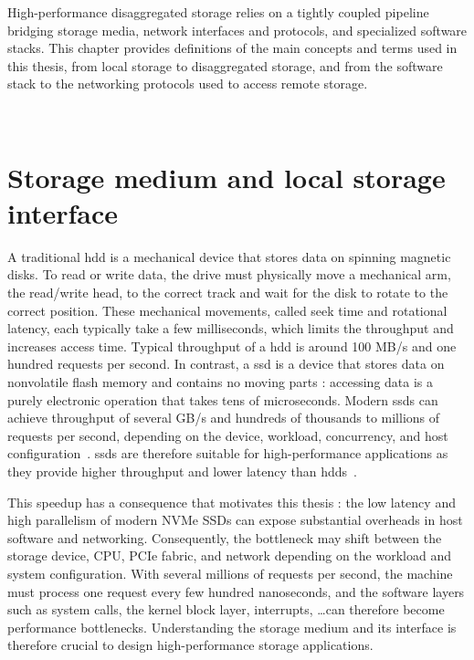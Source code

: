 High-performance disaggregated storage relies on a tightly coupled pipeline bridging storage media, network interfaces and protocols, and specialized software stacks. This chapter provides definitions of the main concepts and terms used in this thesis, from local storage to disaggregated storage, and from the software stack to the networking protocols used to access remote storage.

~


\section{Storage medium and local storage interface}

A traditional \acrfull{hdd} is a mechanical device that stores data on spinning magnetic disks. To read or write data, the drive must physically move a mechanical arm, the read/write head, to the correct track and wait for the disk to rotate to the correct position. These mechanical movements, called seek time and rotational latency, each typically take a few milliseconds, which limits the throughput and increases access time. Typical throughput of a \acrshort{hdd} is around 100 MB/s and one hundred requests per second.  In contrast, a \acrfull{ssd} is a device that stores data on nonvolatile flash memory and contains no moving parts : accessing data is a purely electronic operation that takes tens of microseconds. Modern \acrshort{ssd}s can achieve throughput of several GB/s and hundreds of thousands to millions of requests per second, depending on the device, workload, concurrency, and host configuration~\cite{ren_bfq_2024}. \acrshort{ssd}s are therefore suitable for high-performance applications as they provide higher throughput and lower latency than \acrshort{hdd}s~\cite{mecheloni_inside_2018,haas_what_2023}.


This speedup has a consequence that motivates this thesis : the low latency and high parallelism of modern NVMe SSDs can expose substantial overheads in host software and networking. Consequently, the bottleneck may shift between the storage device, CPU, PCIe fabric, and network depending on the workload and system configuration. With several millions of requests per second, the machine must process one request every few hundred nanoseconds, and the software layers such as system calls, the kernel block layer, interrupts, \dots can therefore become performance bottlenecks. Understanding the storage medium and its interface is therefore crucial to design high-performance storage applications.

